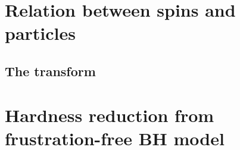 % 

\section{Relation between spins and particles}

\subsection{The transform}

\section{Hardness reduction from frustration-free BH model}
